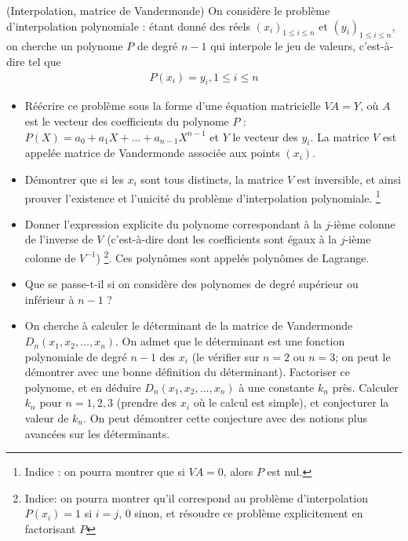 \documentclass[10pt,a4paper]{article}
\newcounter{numeroexo}
\newcommand{\exercice}{\medskip\par\noindent\stepcounter{numeroexo}
	\hspace{-.25cm}\fbox{\textbf{Exercice \arabic{numeroexo}}}\quad}
\begin{document}
\exercice (Interpolation, matrice de Vandermonde) On considère le problème d'interpolation
polynomiale : étant donné des réels $(x_i)_{1 \leq i \leq n}$ et
$(y_i)_{1 \leq i \leq n}$, on cherche un polynome $P$ de degré $n-1$
qui interpole le jeu de valeurs, c'est-à-dire tel que
\begin{align*}
  P(x_i) = y_i, 1 \leq i \leq n
\end{align*}
\begin{itemize}
\item Réécrire ce problème sous la forme d'une équation matricielle $V
  A = Y$, o\`u $A$ est le vecteur des coefficients du polynome $P$ :
  $P(X) = a_0 + a_1 X + \dots + a_{n-1} X^{n-1}$ et $Y$ le vecteur des
  $y_i$.  La matrice $V$ est appelée matrice de Vandermonde associée
  aux points $(x_i)$.
\item Démontrer que si les $x_i$ sont tous distincts, la matrice $V$
  est inversible, et ainsi prouver l'existence et l'unicité du
  problème d'interpolation polynomiale. \footnote{Indice : on pourra
    montrer que si $V A = 0$, alors $P$ est nul.}
\item Donner l'expression explicite du polynome correspondant à la
  $j$-ième colonne de l'inverse de $V$ (c'est-à-dire dont les
  coefficients sont égaux à la $j$-ième colonne de $V^{-1}$)
  \footnote{Indice: on pourra montrer qu'il correspond au problème
    d'interpolation $P(x_i) = 1$ si $i = j$, 0 sinon, et résoudre ce
    problème explicitement en factorisant $P$}. Ces polynômes sont
  appelés polynômes de Lagrange.
\item Que se passe-t-il si on considère des polynomes
  de degré supérieur ou inférieur à $n-1$ ?
\item On cherche à calculer le déterminant de la matrice de
  Vandermonde $D_n(x_1, x_2, \dots, x_n)$. On admet que le déterminant
  est une fonction polynomiale de degré $n-1$ des $x_i$ (le vérifier
  sur $n = 2$ ou $n = 3$; on peut le démontrer avec une bonne
  définition du déterminant). Factoriser ce polynome, et en déduire
  $D_n(x_1, x_2, \dots, x_n)$ à une constante $k_n$ près. Calculer
  $k_n$ pour $n = 1, 2, 3$ (prendre des $x_i$ où le calcul est
  simple), et conjecturer la valeur de $k_n$. On peut démontrer cette
  conjecture avec des notions plus avancées sur les déterminants.
\end{itemize}
\end{document}
